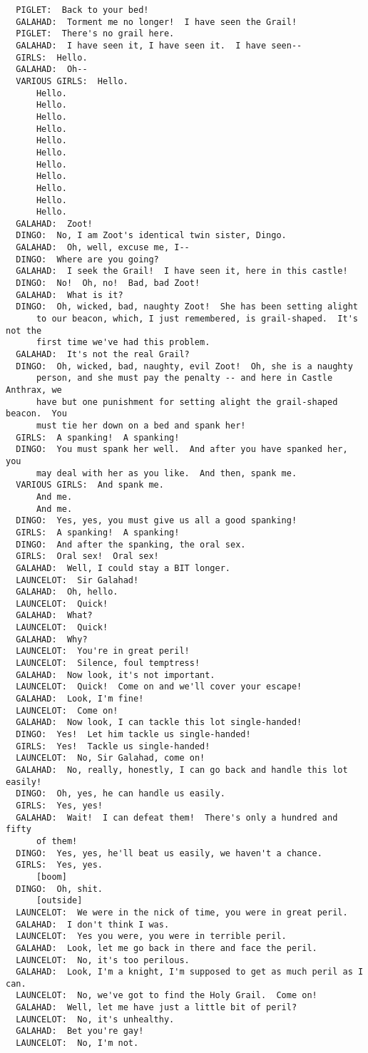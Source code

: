 \documentclass{article}
\begin{document}
\begin{verbatim}
  PIGLET:  Back to your bed!
  GALAHAD:  Torment me no longer!  I have seen the Grail!
  PIGLET:  There's no grail here.
  GALAHAD:  I have seen it, I have seen it.  I have seen--
  GIRLS:  Hello.
  GALAHAD:  Oh--
  VARIOUS GIRLS:  Hello.
      Hello.
      Hello.
      Hello.
      Hello.
      Hello.
      Hello.
      Hello.
      Hello.
      Hello.
      Hello.
      Hello.
  GALAHAD:  Zoot!
  DINGO:  No, I am Zoot's identical twin sister, Dingo.
  GALAHAD:  Oh, well, excuse me, I--
  DINGO:  Where are you going?
  GALAHAD:  I seek the Grail!  I have seen it, here in this castle!
  DINGO:  No!  Oh, no!  Bad, bad Zoot!
  GALAHAD:  What is it?
  DINGO:  Oh, wicked, bad, naughty Zoot!  She has been setting alight
      to our beacon, which, I just remembered, is grail-shaped.  It's not the
      first time we've had this problem.
  GALAHAD:  It's not the real Grail?
  DINGO:  Oh, wicked, bad, naughty, evil Zoot!  Oh, she is a naughty
      person, and she must pay the penalty -- and here in Castle Anthrax, we
      have but one punishment for setting alight the grail-shaped beacon.  You
      must tie her down on a bed and spank her!
  GIRLS:  A spanking!  A spanking!
  DINGO:  You must spank her well.  And after you have spanked her, you
      may deal with her as you like.  And then, spank me.
  VARIOUS GIRLS:  And spank me.
      And me.
      And me.
  DINGO:  Yes, yes, you must give us all a good spanking!
  GIRLS:  A spanking!  A spanking!
  DINGO:  And after the spanking, the oral sex.
  GIRLS:  Oral sex!  Oral sex!
  GALAHAD:  Well, I could stay a BIT longer.
  LAUNCELOT:  Sir Galahad!
  GALAHAD:  Oh, hello.
  LAUNCELOT:  Quick!
  GALAHAD:  What?
  LAUNCELOT:  Quick!
  GALAHAD:  Why?
  LAUNCELOT:  You're in great peril!
  LAUNCELOT:  Silence, foul temptress!
  GALAHAD:  Now look, it's not important.
  LAUNCELOT:  Quick!  Come on and we'll cover your escape!
  GALAHAD:  Look, I'm fine!
  LAUNCELOT:  Come on!
  GALAHAD:  Now look, I can tackle this lot single-handed!
  DINGO:  Yes!  Let him tackle us single-handed!
  GIRLS:  Yes!  Tackle us single-handed!
  LAUNCELOT:  No, Sir Galahad, come on!
  GALAHAD:  No, really, honestly, I can go back and handle this lot easily!
  DINGO:  Oh, yes, he can handle us easily.
  GIRLS:  Yes, yes!
  GALAHAD:  Wait!  I can defeat them!  There's only a hundred and fifty
      of them!
  DINGO:  Yes, yes, he'll beat us easily, we haven't a chance.
  GIRLS:  Yes, yes.
      [boom]
  DINGO:  Oh, shit.
      [outside]
  LAUNCELOT:  We were in the nick of time, you were in great peril.
  GALAHAD:  I don't think I was.
  LAUNCELOT:  Yes you were, you were in terrible peril.
  GALAHAD:  Look, let me go back in there and face the peril.
  LAUNCELOT:  No, it's too perilous.
  GALAHAD:  Look, I'm a knight, I'm supposed to get as much peril as I can.
  LAUNCELOT:  No, we've got to find the Holy Grail.  Come on!
  GALAHAD:  Well, let me have just a little bit of peril?
  LAUNCELOT:  No, it's unhealthy.
  GALAHAD:  Bet you're gay!
  LAUNCELOT:  No, I'm not.


\end{verbatim}
\end{document}
